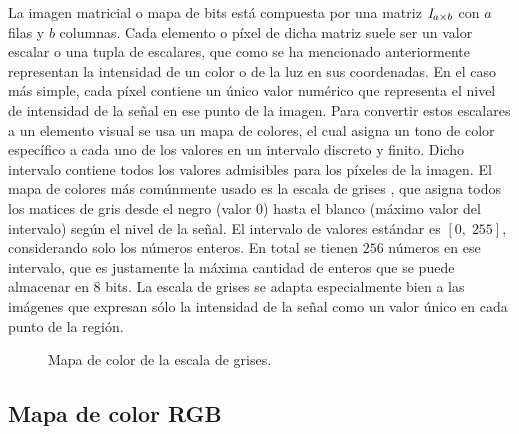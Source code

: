 La imagen matricial o mapa de bits est\'a compuesta por una matriz $\mathbb{\mathit{I}}_{a \times b}$ con $a$ filas y $b$ columnas. Cada elemento o p\'ixel de dicha matriz suele ser un valor escalar o una tupla de escalares, que como se ha mencionado anteriormente representan la intensidad de un color o de la luz en sus coordenadas. En el caso más simple, cada píxel contiene un único valor numérico que representa el nivel de intensidad de la señal en ese punto de la imagen. Para convertir estos escalares a un elemento visual se usa un mapa de colores, el cual asigna un tono de color espec\'ifico a cada uno de los valores en un intervalo discreto y finito. Dicho intervalo contiene todos los valores admisibles para los p\'ixeles de la imagen. El mapa de colores más comúnmente usado es la escala de grises \cite{enwiki:gs}, que asigna todos los matices de gris desde el negro (valor $0$) hasta el blanco (máximo valor del intervalo) según el nivel de la señal. El intervalo de valores estándar es $[0,\; 255]$, considerando solo los n\'umeros enteros. En total se tienen $256$ n\'umeros en ese intervalo, que es justamente la m\'axima cantidad de enteros que se puede almacenar en 8 bits. La escala de grises se adapta especialmente bien a las imágenes que expresan sólo la intensidad de la señal como un valor único en cada punto de la región.
\begin{figure}[h]
	\centering
	\caption{Mapa de color de la escala de grises.}
\end{figure}

\subsection{Mapa de color RGB}

